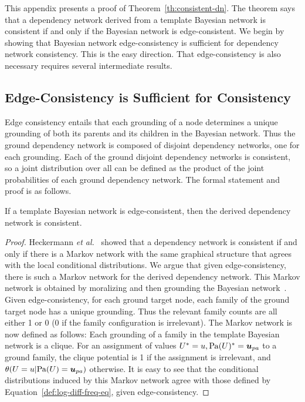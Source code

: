 \documentclass[runningheads,a4paper]{llncs}
\begin{document}
This appendix presents a proof of Theorem~\ref{th:consistent-dn}. The theorem says that a dependency network derived from a template Bayesian network is consistent if and only if the Bayesian network is edge-consistent. We begin by showing that Bayesian network edge-consistency is sufficient for dependency network consistency. This is the easy direction. That edge-consistency is also necessary requires several intermediate results.

\subsection{Edge-Consistency is Sufficient for Consistency}

Edge consistency entails that each grounding of a node determines a unique grounding of both its parents and its children in the Bayesian network. Thus the ground dependency network is composed of disjoint dependency networks, one for each grounding. Each of the ground disjoint dependency networks is consistent, so a joint distribution over all can be defined as the product of the joint probabilities of each ground dependency network. The formal statement and proof is as follows.

\begin{proposition}
If a template Bayesian network is edge-consistent, then the derived dependency network is consistent.
\end{proposition}

\begin{proof} Heckermann {\em et al.}~\cite{Heckerman2000} showed that a dependency network is consistent if and only if there is a Markov network with the same graphical structure that agrees with the local conditional distributions. We argue that given edge-consistency, there is such a Markov network for the derived dependency network. This Markov network  is obtained by moralizing and then grounding the Bayesian network~\cite{Domingos2009}. Given edge-consistency, for each ground target node, each family of the ground target node has a unique grounding. Thus the relevant family counts are all either 1 or 0 (0 if the family configuration is irrelevant). The Markov network is now defined as follows: Each grounding of a family in the template Bayesian network is a clique. For an assignment of values $\FG{\UT} = \UV,\FG{\Pa{\UT}} = \Prange{\UT}$ to a ground family, the clique potential is 1 if the assignment is irrelevant, and $\cprob{\UT = \UV}{\Pa{\UT} = \Prange{\UT}}$ otherwise. It is easy to see that the conditional distributions induced by this Markov network agree with those defined by Equation~\ref{def:log-diff-freq-eq}, given edge-consistency.
\end{proof}
\end{document}
